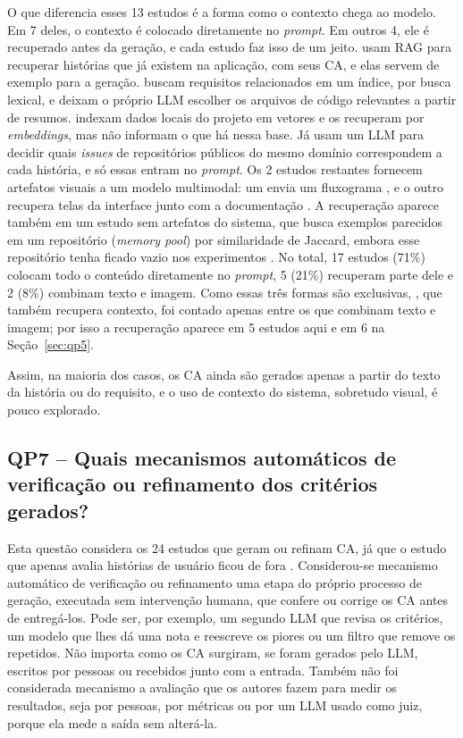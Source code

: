 O que diferencia esses 13 estudos é a forma como o contexto chega ao modelo. Em 7 deles, o contexto é colocado diretamente no \textit{prompt}. Em outros 4, ele é recuperado antes da geração, e cada estudo faz isso de um jeito.  usam RAG para recuperar histórias que já existem na aplicação, com seus CA, e elas servem de exemplo para a geração.  buscam requisitos relacionados em um índice, por busca lexical, e deixam o próprio LLM escolher os arquivos de código relevantes a partir de resumos.  indexam dados locais do projeto em vetores e os recuperam por \textit{embeddings}, mas não informam o que há nessa base. Já  usam um LLM para decidir quais \textit{issues} de repositórios públicos do mesmo domínio correspondem a cada história, e só essas entram no \textit{prompt}. Os 2 estudos restantes fornecem artefatos visuais a um modelo multimodal: um envia um fluxograma \cite{zyberaj2026}, e o outro recupera telas da interface junto com a documentação \cite{wang2025}. A recuperação aparece também em um estudo sem artefatos do sistema, que busca exemplos parecidos em um repositório (\textit{memory pool}) por similaridade de Jaccard, embora esse repositório tenha ficado vazio nos experimentos \cite{zhang2025}. No total, 17 estudos (71\%) colocam todo o conteúdo diretamente no \textit{prompt}, 5 (21\%) recuperam parte dele e 2 (8\%) combinam texto e imagem. Como essas três formas são exclusivas, , que também recupera contexto, foi contado apenas entre os que combinam texto e imagem; por isso a recuperação aparece em 5 estudos aqui e em 6 na Seção~\ref{sec:qp5}.

Assim, na maioria dos casos, os CA ainda são gerados apenas a partir do texto da história ou do requisito, e o uso de contexto do sistema, sobretudo visual, é pouco explorado.

\subsection{QP7 -- Quais mecanismos automáticos de verificação ou refinamento dos critérios gerados?}
\label{sec:qp7}

Esta questão considera os 24 estudos que geram ou refinam CA, já que o estudo que apenas avalia histórias de usuário ficou de fora \cite{ma2026}. Considerou-se mecanismo automático de verificação ou refinamento uma etapa do próprio processo de geração, executada sem intervenção humana, que confere ou corrige os CA antes de entregá-los. Pode ser, por exemplo, um segundo LLM que revisa os critérios, um modelo que lhes dá uma nota e reescreve os piores ou um filtro que remove os repetidos. Não importa como os CA surgiram, se foram gerados pelo LLM, escritos por pessoas ou recebidos junto com a entrada. Também não foi considerada mecanismo a avaliação que os autores fazem para medir os resultados, seja por pessoas, por métricas ou por um LLM usado como juiz, porque ela mede a saída sem alterá-la.

